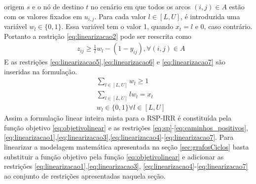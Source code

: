 origem $s$ e o nó de destino $t$ no cenário em que todos os arcos $(i,j) \in A$ estão com os valores fixados em $u_{i,j}$. Para cada valor
$l \in [L,U]$, é introduzida uma variável $w_l \in \{0,1\}$. Essa variável tem o valor 1, quando $x_t = l$ e 0, caso contrário.
Portanto a restrição \eqref{eq:linearizacao2} pode ser reescrita como
\begin{align}
    & z_{ij} \geq \frac{1}{l}w_l - (1 - y_{ij}), \forall (i,j) \in A \label{eq:linearizacao4}
\end{align}
E as restrições \eqref{eq:linearizacao5},\eqref{eq:linearizacao6} e \eqref{eq:linearizacao7} são inseridas na formulação. 
\begin{align}
    & \sum\limits_{l \in [L,U]} w_l \geq 1  \label{eq:linearizacao5} \\
    & \sum\limits_{l \in [L,U]} lw_l = x_t  \label{eq:linearizacao6} \\
    & w_l \in \{0,1\} \forall l \in [L,U] \label{eq:linearizacao7}
\end{align}
Assim a formulação linear inteira mista para o RSP-IRR é constituída pela função objetivo \eqref{eq:objetivolinear} e as restrições 
\eqref{eq:sp}-\eqref{eq:caminhos_positivos}, \eqref{eq:linearizacao1},\eqref{eq:linearizacao3},\eqref{eq:linearizacao4}-\eqref{eq:linearizacao7}. Para
linearizar a modelagem matemática apresentada na seção \ref{sec:grafosCiclos} basta substituir a função objetivo pela função \eqref{eq:objetivolinear} 
e adicionar as restrições \eqref{eq:linearizacao1},\eqref{eq:linearizacao3},
\eqref{eq:linearizacao4}-\eqref{eq:linearizacao7} ao conjunto de restrições apresentadas naquela seção.
